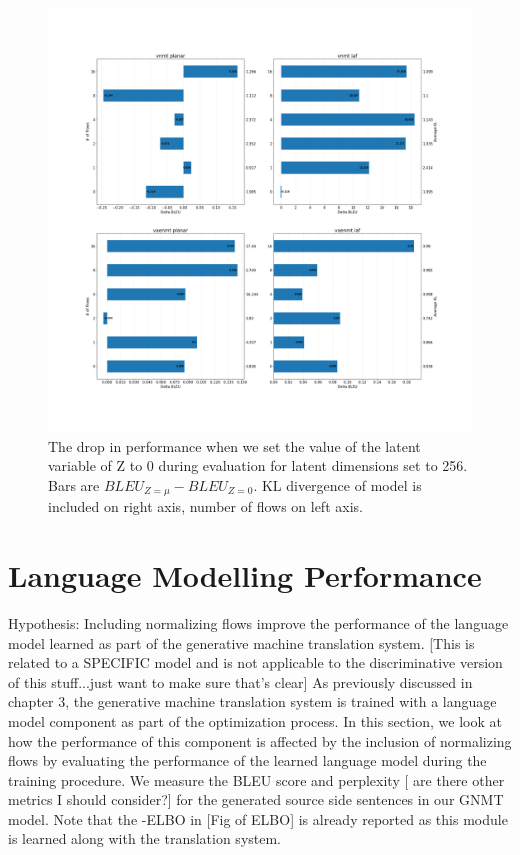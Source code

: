 \begin{figure}
	\includegraphics[width=\linewidth]{diff-z-256-horizontalbarplt.png}
	\caption{The drop in performance when we set the value of the latent variable of Z to 0 during evaluation for latent dimensions set to 256. Bars are $BLEU_{Z=\mu} - BLEU_{Z=0}$. KL divergence of model is included on right axis, number of flows on left axis.}
	\label{fig:barperfdrop}
\end{figure}

\section{Language Modelling Performance}

Hypothesis: Including normalizing flows improve the performance of the language model learned as part of the generative machine translation system. [This is related to a SPECIFIC model and is not applicable to the discriminative version of this stuff...just want to make sure that's clear]
As previously discussed in chapter 3, the generative machine translation system is trained with a language model component as part of the optimization process. In this section, we look at how the performance of this component is affected by the inclusion of normalizing flows by evaluating the performance of the learned language model during the training procedure. We measure the BLEU score and perplexity  [ are there other metrics I should consider?] for the generated source side sentences in our GNMT model. Note that the -ELBO in [Fig of ELBO] is already reported as this module is learned along with the translation system.

